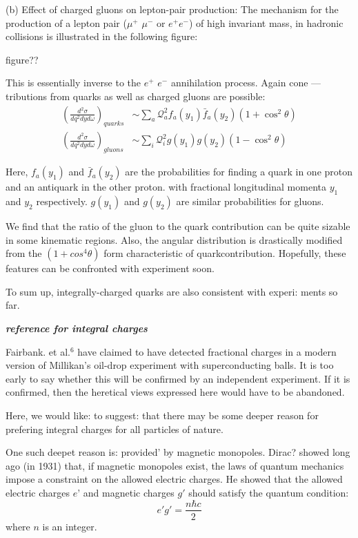 (b) {Effect of charged gluons on lepton-pair production:} The mechanism
for the production of a lepton pair ($\mu^{+}$ $\mu^{-}$ or $e^{+} e^{-}$) of high invariant mass,
in hadronic collisions is illustrated in the following figure: 

figure??


This is essentially inverse to the $e^{+}$ $e^{-}$ annihilation process. Again cone —
tributions from quarks as well as charged gluons are possible: 
\begin{align*}
\left(\frac{d^{2}\sigma}{dq^{2} dy d\omega} \right)_{quarks} &\sim \sum_{a} \mathcal{Q}^{2}_{a} f_{a}(y_{1}) \bar{f}_{a}(y_{2})(1+ \cos^{2} \theta)\\
\left(\frac{d^{2}\sigma}{dq^{2} dy d\omega} \right)_{gluons} & \sim \sum_{i} \mathcal{Q}^{2}_{i}g(y_{1}) g(y_{2}) (1-\cos^{2} \theta)
\end{align*}

Here, $f_{a}(y_{1})$ and $\bar{f}_{a}(y_{2})$ are the probabilities for finding a quark in one
proton and an antiquark in the other proton. with fractional longitudinal
momenta $y_{1}$ and $y_{2}$ respectively. $g(y_{1})$ and $g(y_{2})$ are similar probabilities
for gluons. 


We find that the ratio of the gluon to the quark contribution can be
quite sizable in some kinematic regions. Also, the angular distribution
is drastically modified from the $(1 + cos^{4}\theta)$ form characteristic of quarkcontribution. Hopefully, these features can be confronted with experiment
soon. 

To sum up, integrally-charged quarks are also consistent with experi:
ments so far. 

\textbf{{\it reference for integral charges}}

Fairbank. et al.$^{6}$ have claimed to have detected fractional charges in a
modern version of Millikan’s oil-drop experiment with superconducting
balls. It is too early to say whether this will be confirmed by an independent experiment. If it is confirmed, then the heretical views expressed here
would have to be abandoned. 

Here, we would like: to suggest: that there may be some deeper reason
for prefering integral charges for all particles of nature. 

One such deepet reason is: provided’ by magnetic monopoles. Dirac?
showed long ago (in 1931) that, if magnetic monopoles exist, the laws of
quantum mechanics impose a constraint on the allowed electric charges.
He showed that the allowed electric charges $e’$ and magnetic charges $g'$
should satisfy the quantum condition: 
$$
e'g' = \frac{n \hbar c}{2}
$$
where $n$ is an integer.

